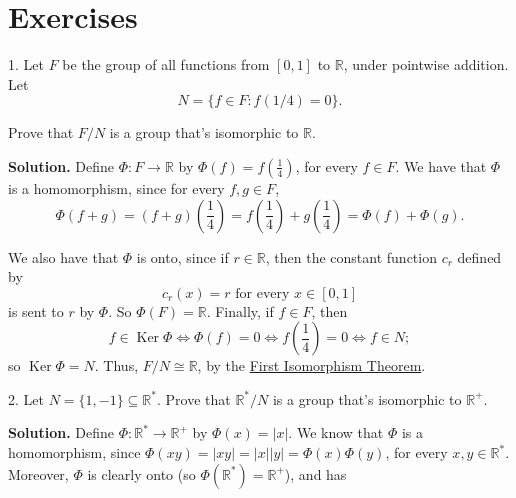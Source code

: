 \documentclass[10pt,]{book}
\theoremstyle{plain}
\theoremstyle{definition}
\theoremstyle{definition}
\theoremstyle{definition}
\theoremstyle{definition}
\numberwithin{equation}{section}
\def\R{\mathbb{R}}
\DeclareMathOperator{\Ker}{Ker}
\begin{document}
\section[{Exercises}]{Exercises}\label{exercises-10}
\begin{exerciselist}
\item[1.]\hypertarget{exercise-63}{}Let \(F\) be the group of all functions from \([0,1]\) to \(\R\), under pointwise addition. Let%
\begin{equation*}
N=\{f\in F:
f(1/4)=0\}.
\end{equation*}
%
\par
Prove that \(F/N\) is a group that's isomorphic to \(\R\).%
\par\smallskip
\par\smallskip
\noindent\textbf{Solution.}\hypertarget{solution-63}{}\quad
Define \(\Phi:F\rightarrow \R\) by \(\Phi(f)=f\left(\frac{1}{4}\right)\), for every \(f\in F\). We have that \(\Phi\) is a homomorphism, since for every \(f, g\in F\),%
\begin{equation*}
\Phi(f+g)=(f+g)\left(\frac{1}{4}\right)=f\left(\frac{1}{4}\right)+g\left(\frac{1}{4}\right)=\Phi(f)+\Phi(g).
\end{equation*}
%
\par
We also have that \(\Phi\) is onto, since if \(r\in \R\), then the constant function \(c_r\) defined by%
\begin{equation*}
c_r(x)=r \mbox{ for every \(x\in
[0,1]\)}
\end{equation*}
is sent to \(r\) by \(\Phi\). So \(\Phi(F)=\R\). Finally, if \(f\in F\), then%
\begin{equation*}
f\in \Ker \Phi \Leftrightarrow \Phi(f)=0 \Leftrightarrow
f\left(\frac{1}{4}\right)=0 \Leftrightarrow f\in N;
\end{equation*}
so \(\Ker
\Phi=N\). Thus, \(F/N \cong \R\), by the \hyperref[fit]{First Isomorphism Theorem}.%
\item[2.]\hypertarget{exercise-64}{}Let \(N=\{1,-1\}\subseteq \R^*\). Prove that \(\R^*/N\) is a group that's isomorphic to \(\R^+\).%
\par\smallskip
\par\smallskip
\noindent\textbf{Solution.}\hypertarget{solution-64}{}\quad
Define \(\Phi: \R^* \rightarrow \R^+\) by \(\Phi(x)=|x|\). We know that \(\Phi\) is a homomorphism, since \(\Phi(xy)=|xy|=|x||y|=\Phi(x)\Phi(y)\), for every \(x,y\in \R^*\). Moreover, \(\Phi\) is clearly onto (so \(\Phi(\R^*)=\R^+\)), and has%
\begin{equation*}

\end{equation*}
\end{exerciselist}
\end{document}

